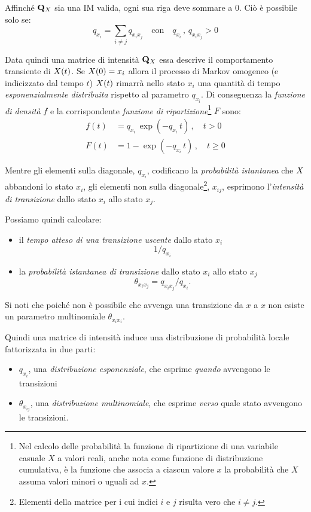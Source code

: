 Affinché $\mathbf{Q}_{\mathnormal{X}}$ sia una \acl{IM} valida, ogni sua riga deve sommare a $0$. Ciò è possibile solo se:
\[
q_{x_i}=\sum_{i \neq j}q_{x_ix_j}\quad\text{con}\quad q_{x_i}\,,\,q_{x_ix_j}>0
\]

Data quindi una matrice di intensità $\mathbf{Q}_{\mathnormal{X}}$ essa descrive il comportamento transiente di $\mathnormal{X}(t)$. Se $\mathnormal{X}(0)=x_i$ allora il processo di Markov omogeneo (e indicizzato dal tempo $t$) $\mathnormal{X}(t)$ rimarrà nello stato $x_i$ una quantità di tempo \emph{esponenzialmente distribuita} rispetto al parametro $q_{x_i}$. Di conseguenza la \emph{funzione di densità} $f$ e la corrispondente \emph{funzione di ripartizione}\footnote{Nel calcolo delle probabilità la funzione di ripartizione di una variabile casuale $X$ a valori reali, anche nota come funzione di distribuzione cumulativa, è la funzione che associa a ciascun valore $x$ la probabilità che $X$ assuma valori minori o uguali ad $x$.} $F$ sono:
\begin{equation}
\label{eq:im-distrib}
\begin{split}
f(t) &= q_{x_i}\,\exp(-q_{x_i}\,t)\,,\quad t>0 \\
F(t) &= 1-\exp(-q_{x_i}\,t)\,,\quad t\geq0
\end{split} 
\end{equation}

Mentre gli elementi sulla diagonale, $q_{x_i}$, codificano la \emph{probabilità istantanea} che $\mathnormal{X}$ abbandoni lo stato $x_i$, gli elementi non sulla diagonale\footnote{Elementi della matrice per i cui indici $i$ e $j$ risulta vero che $i \neq j$.}, $x_{ij}$, esprimono l'\emph{intensità di transizione} dallo stato $x_i$ allo stato $x_j$. 

Possiamo quindi calcolare:
\begin{itemize}
    \item il \emph{tempo atteso di una transizione uscente} dallo stato $x_i$ \[1/q_{x_i}\]
    \item la \emph{probabilità istantanea di transizione} dallo stato $x_i$ allo stato $x_j$ \[\theta_{x_ix_j}=q_{x_ix_j}/q_{x_i}\text{.}\]
\end{itemize}
\begin{osservazione}
Si noti che poiché non è possibile che avvenga una transizione da $x$ a $x$ non esiste un parametro multinomiale $\theta_{x_ix_i}$.
\end{osservazione}


Quindi una matrice di intensità induce una distribuzione di probabilità locale fattorizzata in due parti:
\begin{itemize}
    \item $q_{x_i}$, una \emph{distribuzione esponenziale}, che esprime \emph{quando} avvengono le transizioni
    \item $\theta_{x_{ij}}$, una \emph{distribuzione multinomiale}, che esprime \emph{verso} quale stato avvengono le transizioni.
\end{itemize}

